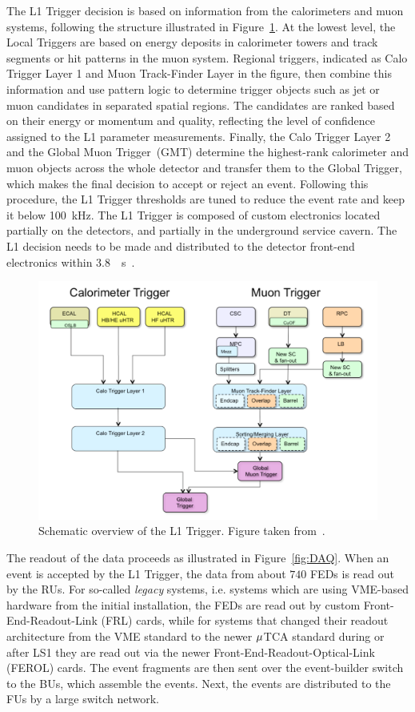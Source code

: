 The \ac{L1} Trigger decision is based on information from the calorimeters and muon systems, following the structure illustrated in Figure~\ref{fig:L1}. At the lowest level, the Local Triggers are based on energy deposits in calorimeter towers and track segments or hit patterns in the muon system. Regional triggers, indicated as Calo Trigger Layer 1 and Muon Track-Finder Layer in the figure, then combine this information and use pattern logic to determine trigger objects such as jet or muon candidates in separated spatial regions. The candidates are ranked based on their energy or momentum and quality, reflecting the level of confidence assigned to the \ac{L1} parameter measurements. Finally, the Calo Trigger Layer 2 and the Global Muon Trigger~(GMT) determine the highest-rank calorimeter and muon objects across the whole detector and transfer them to the Global Trigger, which makes the final decision to accept or reject an event. Following this procedure, the \ac{L1} Trigger thresholds are tuned to reduce the event rate and keep it below \SI{100}{kHz}. The \ac{L1} Trigger is composed of custom electronics located partially on the detectors, and partially in the underground service cavern. The \ac{L1} decision needs to be made and distributed to the detector front-end electronics within \SI{3.8}{\mu s}~\cite{Tapper:2013yva}.

\begin{figure}[ht]
  \centering
 \includegraphics[width=.9\textwidth]{trigger}
 \caption{Schematic overview of the \ac{L1} Trigger. Figure taken from~\cite{Tapper:2013yva}.}
 \label{fig:L1}
\end{figure}
 
The readout of the data proceeds as illustrated in Figure~\ref{fig:DAQ}. When an event is accepted by the \ac{L1} Trigger, the data from about $740$ \acp{FED} is read out by the \acp{RU}. For so-called {\it legacy} systems, i.e. systems which are using VME-based hardware from the initial installation, the \acp{FED} are read out by custom Front-End-Readout-Link (FRL) cards, while for systems that changed their readout architecture from the VME standard to the newer $\rm \mu{}$TCA standard during or after LS1 they are read out via the newer Front-End-Readout-Optical-Link (FEROL) cards. The event fragments are then sent over the event-builder switch to the \acp{BU}, which assemble the events. Next, the events are distributed to the \acp{FU} by a large switch network.

